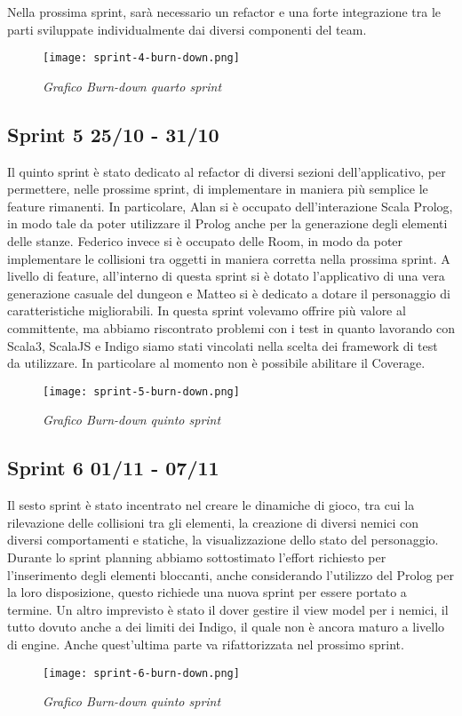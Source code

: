 Nella prossima sprint, sarà necessario un refactor e una forte integrazione tra le parti sviluppate individualmente dai diversi componenti del team.

\begin{figure}[!hbt]
    \centering
    \texttt{[image: sprint-4-burn-down.png]}
    \caption{\textit{Grafico Burn-down quarto sprint}} 
\end{figure}

\subsection{Sprint 5 25/10 - 31/10}
Il quinto sprint è stato dedicato al refactor di diversi sezioni dell'applicativo, per permettere, nelle prossime sprint, di implementare in maniera più semplice le feature rimanenti.  
In particolare, Alan si è occupato dell'interazione Scala Prolog, in modo tale da poter utilizzare il Prolog anche per la generazione degli elementi delle stanze. Federico invece si è occupato delle Room, in modo da poter implementare le collisioni tra oggetti in maniera corretta nella prossima sprint. 
A livello di feature, all'interno di questa sprint si è dotato l'applicativo di una vera generazione casuale del dungeon e Matteo si è dedicato a dotare il personaggio di caratteristiche migliorabili. 
In questa sprint volevamo offrire più valore al committente, ma abbiamo riscontrato problemi con i test in quanto lavorando con Scala3, ScalaJS e Indigo siamo stati vincolati nella scelta dei framework di test da utilizzare. In particolare al momento non è possibile abilitare il Coverage.


\begin{figure}[!hbt]
    \centering
    \texttt{[image: sprint-5-burn-down.png]}
    \caption{\textit{Grafico Burn-down quinto sprint}} 
\end{figure}

\subsection{Sprint 6 01/11 - 07/11}
Il sesto sprint è stato incentrato nel creare le dinamiche di gioco, tra cui la rilevazione delle collisioni tra gli elementi, la creazione di diversi nemici con diversi comportamenti e statiche, la visualizzazione dello stato del personaggio. 
Durante lo sprint planning abbiamo sottostimato l'effort richiesto per l'inserimento degli elementi bloccanti, anche considerando l'utilizzo del Prolog per la loro disposizione, questo richiede una nuova sprint per essere portato a termine. Un altro imprevisto è stato il dover gestire il view model per i nemici, il tutto dovuto anche a dei limiti dei Indigo, il quale non è ancora maturo a livello di engine. Anche quest'ultima parte va rifattorizzata nel prossimo sprint.
\begin{figure}[!hbt]
    \centering
    \texttt{[image: sprint-6-burn-down.png]}
    \caption{\textit{Grafico Burn-down quinto sprint}} 
\end{figure}
